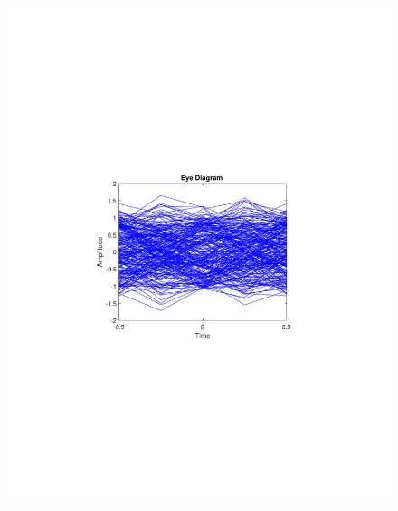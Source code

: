 \begin{refsection}
\begin{figure}[H]
\begin{minipage}{0.30\textwidth}
		\includegraphics[clip, trim=4cm 8cm 4cm 8cm, width=1\textwidth]{./sdf/m_qam_system/figures/expResults/homodyne/3_eye_16GBdInSig13dB_AfMIMO1.pdf}
		\label{fig:16GBdSpecMIMO1}
	\end{minipage}
	\begin{minipage}{0.30\textwidth}
		\centering

\end{minipage}
\end{figure}
\end{refsection}

